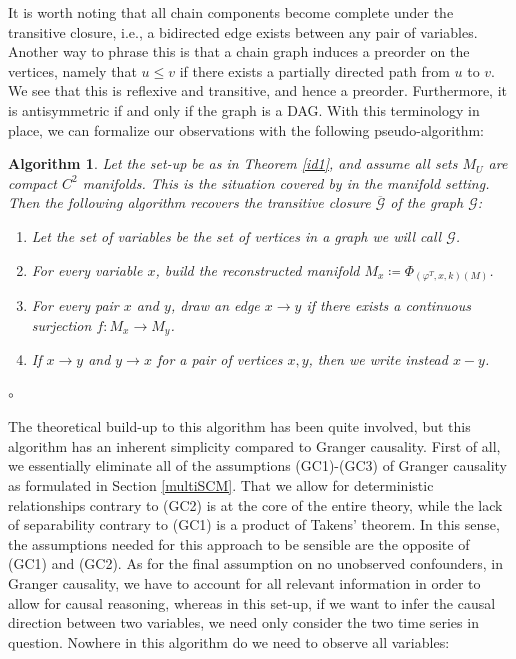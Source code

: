 \documentclass[11pt, a4paper]{memoir}
\theoremstyle{break}
\theoremstyle{break}
\newtheorem{inneralg}{Algorithm}
\newenvironment{alg}{\begin{inneralg}}{\ensuremath{\circ}\end{inneralg}}
\theoremstyle{nonumberplain}
\begin{document}
 It is worth noting that all chain components become complete under the transitive closure, i.e., a bidirected edge exists between any pair of variables. Another way to phrase this is that a chain graph induces a preorder on the vertices, namely that $u\leqslant v$ if there exists a partially directed path from $u$ to $v$. We see that this is reflexive and transitive, and hence a preorder. Furthermore, it is antisymmetric if and only if the graph is a DAG. With this terminology in place, we can formalize our observations with the following pseudo-algorithm:
\begin{alg}
Let the set-up be as in Theorem \ref{id1}, and assume all sets $M_U$ are compact $C^2$ manifolds. This is the situation covered by \cite{mathFound} in the manifold setting. Then the following algorithm recovers the transitive closure $\overline{\mathcal{G}}$ of the graph $\mathcal{G}$:
\begin{enumerate}[label=\roman*.]
	\item Let the set of variables be the set of vertices in a graph we will call $\mathcal{G}$.
	\item For every variable $x$, build the reconstructed manifold $M_x\coloneqq \Phi	_{(\varphi^T,x,k)(M)}$.
	\item For every pair $x$ and $y$, draw an edge $x\to y$ if there exists a continuous surjection $f:M_x\to M_y$.
	\item If $x\to y$ and $y\to x$ for a pair of vertices $x,y$, then we write instead $x-y$.
\end{enumerate}
\end{alg}
The theoretical build-up to this algorithm has been quite involved, but this algorithm has an inherent simplicity compared to Granger causality. First of all, we essentially eliminate all of the assumptions (GC1)-(GC3) of Granger causality as formulated in Section \ref{multiSCM}. That we allow for deterministic relationships contrary to (GC2) is at the core of the entire theory, while the lack of separability contrary to (GC1) is a product of Takens' theorem. In this sense, the assumptions needed for this approach to be sensible are the opposite of (GC1) and (GC2). As for the final assumption on no unobserved confounders, in Granger causality, we have to account for all relevant information in order to allow for causal reasoning, whereas in this set-up, if we want to infer the causal direction between two variables, we need only consider the two time series in question. Nowhere in this algorithm do we need to observe all variables:\\[5pt]
\end{document}
